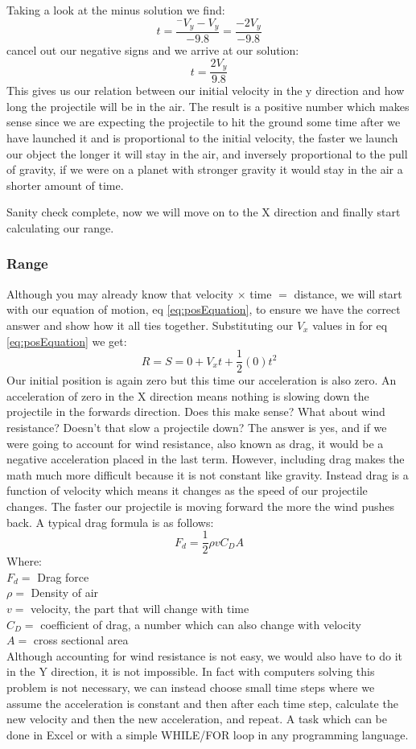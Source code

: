 \documentclass[10pt,a4paper]{article}
\begin{document}
		Taking a look at the minus solution we find:
		\[ t = \frac{^- V_y - V_y}{-9.8} = \frac{-2V_y}{-9.8}\]
		cancel out our negative signs and we arrive at our solution:
		\begin{equation}
			t = \frac{2V_y}{9.8}
			\label{eq:hangTime}
		\end{equation}
		This gives us our relation between our initial velocity in the y direction and how long the projectile will be in the air.
		The result is a positive number which makes sense since we are expecting the projectile to hit the ground some time after we have launched it and is proportional to the initial velocity, the faster we launch our object the longer it will stay in the air, and inversely proportional to the pull of gravity, if we were on a planet with stronger gravity it would stay in the air a shorter amount of time.
		
		Sanity check complete, now we will move on to the X direction and finally start calculating our range.
		
	\subsubsection{Range}
		Although you may already know that velocity $\times$ time $=$ distance, we will start with our equation of motion, eq \ref{eq:posEquation}, to ensure we have the correct answer and show how it all ties together. Substituting our $V_x$ values in for eq \ref{eq:posEquation} we get:
		\[ R = S = 0 + V_xt + \frac{1}{2}(0)t^2 \]
		Our initial position is again zero but this time our acceleration is also zero.
		An acceleration of zero in the X direction means nothing is slowing down the projectile in the forwards direction.
		Does this make sense?
		What about wind resistance?
		Doesn't that slow a projectile down?
		The answer is yes, and if we were going to account for wind resistance, also known as drag, it would be a negative acceleration placed in the last term.
		However, including drag makes the math much more difficult because it is not constant like gravity.
		Instead drag is a function of velocity which means it changes as the speed of our projectile changes.
		The faster our projectile is moving forward the more the wind pushes back.
		A typical drag formula is as follows:
		\[ F_d = \frac{1}{2}\rho v C_D A\]
		Where: \\
		$F_d =$ Drag force \\
		$\rho =$ Density of air \\
		$v =$ velocity, the part that will change with time \\
		$C_D =$ coefficient of drag, a number which can also change with velocity \\
		$A = $ cross sectional area \\
		Although accounting for wind resistance is not easy, we would also have to do it in the Y direction, it is not impossible.
		In fact with computers solving this problem is not necessary, we can instead choose small time steps where we assume the acceleration is constant and then after each time step, calculate the new velocity and then the new acceleration, and repeat.
		A task which can be done in Excel or with a simple WHILE/FOR loop in any programming language.
		
\end{document}
